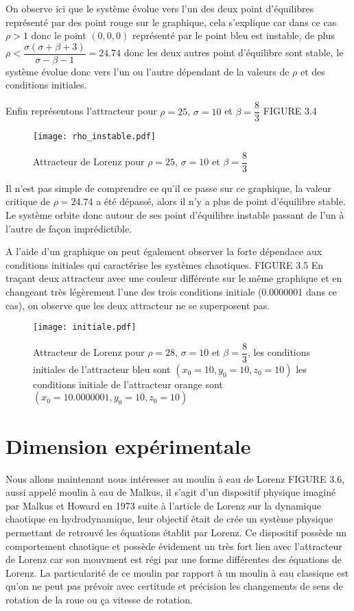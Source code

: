 On observe ici que le système évolue vers l'un des deux point d'équilibres représenté par des point rouge sur le graphique, cela s'explique car dans ce cas $\rho>1$ donc le point $(0,0,0)$ représenté par le point bleu est instable, de plus $\rho < \dfrac{\sigma(\sigma+\beta+3)}{\sigma-\beta-1}=24.74$ donc les deux autres point d'équilibre sont stable, le système évolue donc vers l'un ou l'autre dépendant de la valeurs de $\rho$ et des conditions initiales.  

Enfin représentons l'attracteur pour $\rho=25$, $\sigma=10$ et $\beta=\dfrac{8}{3}$ FIGURE 3.4

\begin{figure}
    \texttt{[image: rho\_instable.pdf]}
    \caption{Attracteur de Lorenz pour $\rho=25$, $\sigma=10$ et $\beta=\dfrac{8}{3}$} 
\end{figure}

Il n'est pas simple de comprendre ce qu'il ce passe sur ce graphique, la valeur critique de $\rho=24.74$ a été dépassé, alors il n'y a plus de point d'équilibre stable. Le système orbite donc autour de ses point d'équilibre instable passant de l'un à l'autre de façon imprédictible.

A l'aide d'un graphique on peut également observer la forte dépendace aux conditions initiales qui caractérise les systèmes chaotiques. FIGURE 3.5 En traçant deux attracteur avec une couleur différente sur le même graphique et en changeant très légèrement l'une des trois conditions initiale (0.0000001 dans ce cas), on observe que les deux attracteur ne se superposent pas.

\begin{figure}
    \texttt{[image: initiale.pdf]}
    \caption{Attracteur de Lorenz pour $\rho=28$, $\sigma=10$ et $\beta=\dfrac{8}{3}$, les conditions initiales de l'attracteur bleu sont $(x_0=10,y_0=10,z_0=10)$ les conditions initiale de l'attracteur orange sont $(x_0=10.0000001,y_0=10,z_0=10)$} 
\end{figure}

\section{Dimension expérimentale}

Nous allons maintenant nous intéresser au moulin à eau de Lorenz FIGURE 3.6, aussi appelé moulin à eau de Malkus, il s'agit d'un dispositif physique imaginé par Malkus et Howard en 1973 suite à l'article de
Lorenz sur la dynamique chaotique en hydrodynamique, leur objectif était de crée un système physique permettant de retrouvé les équations établit par Lorenz. Ce dispositif possède un comportement chaotique et possède évidement un très fort lien avec l'attracteur de Lorenz car son mouvment est régi par une forme différentes des équations de Lorenz. La particularité de ce moulin par rapport à un moulin à eau classique est qu'on ne peut pas prévoir avec certitude et précision les changements de sens de rotation de la roue ou ça vitesse de rotation.

